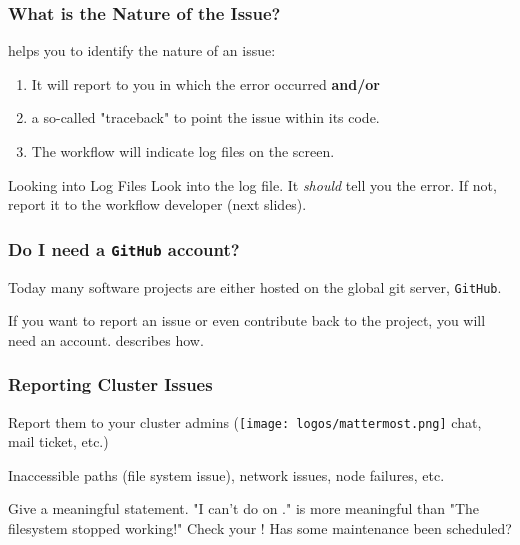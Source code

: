 \begin{frame}
  \frametitle{What is the Nature of the Issue?}
  \Snakemake{} helps you to identify the nature of an issue:
  \begin{enumerate}[<+->]
  	\item It will report to you in which  the error occurred \textbf{and/or}
  	\item a so-called "traceback" to point the issue within its code.
  	\item The workflow will indicate log files on the screen.
  \end{enumerate}
  \pause
  \begin{docs}{Looking into Log Files}
  	Look into the log file. It \textit{should} tell you the error. \pause If not, report it to the workflow developer (next slides). 
  \end{docs}
\end{frame}

\begin{frame}
  \frametitle{Do I need a \texttt{GitHub} account?}
  Today many software projects are either hosted on the global git server, \texttt{GitHub}.
  \begin{docs}
  	If you want to report an issue or even contribute back to the project, you will need an account.  describes how. 
  \end{docs}
  
\end{frame}

\begin{frame}
	\frametitle{Reporting Cluster Issues}
	\begin{question}[Where?]
	  Report them to your cluster admins (\texttt{[image: logos/mattermost.png]} chat, \Email{} mail ticket, etc.)
	\end{question}
    \pause
    \begin{question}[What?]
      Inaccessible paths (file system issue), network issues, node failures, etc. 
    \end{question}
    \pause
    \begin{question}[How?]
      Give a meaningful statement. "I can't do  on ." is more meaningful than "The filesystem stopped working!"\newline
      \bcattention Check your \Email{}! Has some maintenance been scheduled?
    \end{question}	
\end{frame}


